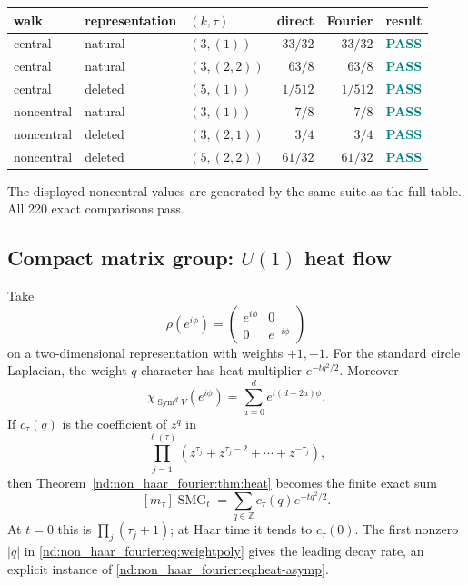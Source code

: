 \documentclass[10pt]{article}
\newcommand{\Sym}{\operatorname{Sym}}
\newcommand{\SMG}{\operatorname{SMG}}
\newcommand{\MGF}{\SMG}
\begin{document}
\begin{center}
\begin{tabular}{@{}lllrrc@{}}
\toprule
walk & representation & $(k,\tau)$ & direct & Fourier & result\\
\midrule
central & natural & $(3,(1))$ & $33/32$ & $33/32$ & \textcolor{teal}{\textbf{PASS}}\\
central & natural & $(3,(2,2))$ & $63/8$ & $63/8$ & \textcolor{teal}{\textbf{PASS}}\\
central & deleted & $(5,(1))$ & $1/512$ & $1/512$ & \textcolor{teal}{\textbf{PASS}}\\
noncentral & natural & $(3,(1))$ & $7/8$ & $7/8$ & \textcolor{teal}{\textbf{PASS}}\\
noncentral & deleted & $(3,(2,1))$ & $3/4$ & $3/4$ & \textcolor{teal}{\textbf{PASS}}\\
noncentral & deleted & $(5,(2,2))$ & $61/32$ & $61/32$ & \textcolor{teal}{\textbf{PASS}}\\
\bottomrule
\end{tabular}
\end{center}
The displayed noncentral values are generated by the same suite as the full
table.  All 220 exact comparisons pass.

\subsection{Compact matrix group: \texorpdfstring{$U(1)$}{U(1)} heat flow}

Take
\begin{equation}\label{nd:non_haar_fourier:eq:u1rep}
 \rho(e^{i\phi})=\begin{pmatrix}e^{i\phi}&0\\0&e^{-i\phi}\end{pmatrix}
\end{equation}
on a two-dimensional representation with weights $+1,-1$.  For the standard
circle Laplacian, the weight-$q$ character has heat multiplier
$e^{-tq^2/2}$.  Moreover
\begin{equation}\label{nd:non_haar_fourier:eq:symweights}
 \chi_{\Sym^dV}(e^{i\phi})
 =\sum_{a=0}^d e^{i(d-2a)\phi}.
\end{equation}
If $c_\tau(q)$ is the coefficient of $z^q$ in
\begin{equation}\label{nd:non_haar_fourier:eq:weightpoly}
 \prod_{j=1}^{\ell(\tau)}
   (z^{\tau_j}+z^{\tau_j-2}+\cdots+z^{-\tau_j}),
\end{equation}
then Theorem~\ref{nd:non_haar_fourier:thm:heat} becomes the finite exact sum
\begin{equation}\label{nd:non_haar_fourier:eq:u1formula}
 \boxed{[m_\tau]\MGF_t
 =\sum_{q\in\mathbb Z}c_\tau(q)e^{-tq^2/2}.}
\end{equation}
At $t=0$ this is $\prod_j(\tau_j+1)$; at Haar time it tends to
$c_\tau(0)$.  The first nonzero $|q|$ in \eqref{nd:non_haar_fourier:eq:weightpoly} gives the
leading decay rate, an explicit instance of \eqref{nd:non_haar_fourier:eq:heat-asymp}.
\end{document}
